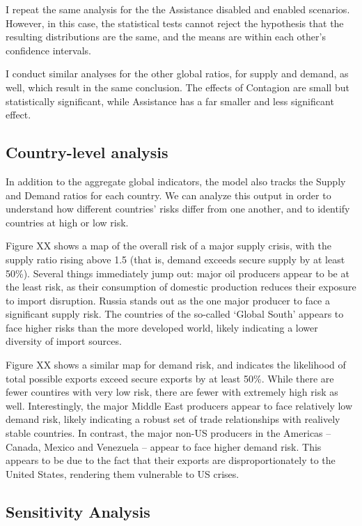 \documentclass{article}
\begin{document}
I repeat the same analysis for the the Assistance disabled and enabled scenarios. However, in this case, the statistical tests cannot reject the hypothesis that the resulting distributions are the same, and the means are within each other's confidence intervals.

I conduct similar analyses for the other global ratios, for supply and demand, as well, which result in the same conclusion. The effects of Contagion are small but statistically significant, while Assistance has a far smaller and less significant effect.

\subsection{Country-level analysis}

In addition to the aggregate global indicators, the model also tracks the Supply and Demand ratios for each country. We can analyze this output in order to understand how different countries' risks differ from one another, and to identify countries at high or low risk.

Figure XX shows a map of the overall risk of a major supply crisis, with the supply ratio rising above 1.5 (that is, demand exceeds secure supply by at least 50\%). Several things immediately jump out: major oil producers appear to be at the least risk, as their consumption of domestic production reduces their exposure to import disruption. Russia stands out as the one major producer to face a significant supply risk. The countries of the so-called `Global South' appears to face higher risks than the more developed world, likely indicating a lower diversity of import sources.

Figure XX shows a similar map for demand risk, and indicates the likelihood of total possible exports exceed secure exports by at least 50\%. While there are fewer countires with very low risk, there are fewer with extremely high risk as well. Interestingly, the major Middle East producers appear to face relatively low demand risk, likely indicating a robust set of trade relationships with realively stable countries. In contrast, the major non-US producers in the Americas -- Canada, Mexico and Venezuela -- appear to face higher demand risk. This appears to be due to the fact that their exports are disproportionately to the United States, rendering them vulnerable to US crises.

\subsection{Sensitivity Analysis}
\end{document}
